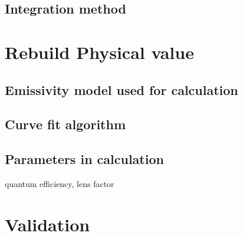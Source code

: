 \subsection{Integration method}
\section{Rebuild Physical value}
\subsection{Emissivity model used for calculation}

\subsection{Curve fit algorithm}

\subsection{Parameters in calculation}
quantum efficiency, lens factor

\section{Validation}